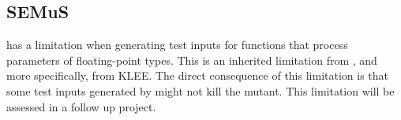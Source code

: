 \subsection{SEMuS}

\SEMUS has a limitation when generating test inputs for functions that process parameters of floating-point types. This is an inherited limitation from \SEMU, and more specifically, from KLEE. The direct consequence of this limitation is that some test inputs generated by \SEMUS might not kill the mutant. This limitation will be assessed in a follow up project.


